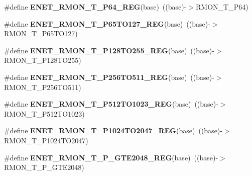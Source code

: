 \begin{DoxyCompactItemize}
\item 
\#define {\bfseries E\+N\+E\+T\+\_\+\+R\+M\+O\+N\+\_\+\+T\+\_\+\+P64\+\_\+\+R\+EG}(base)~((base)-\/$>$R\+M\+O\+N\+\_\+\+T\+\_\+\+P64)\hypertarget{group__ENET__Register__Accessor__Macros_gac6e972af8744e5005a436b92e016fcfd}{}\label{group__ENET__Register__Accessor__Macros_gac6e972af8744e5005a436b92e016fcfd}

\item 
\#define {\bfseries E\+N\+E\+T\+\_\+\+R\+M\+O\+N\+\_\+\+T\+\_\+\+P65\+T\+O127\+\_\+\+R\+EG}(base)~((base)-\/$>$R\+M\+O\+N\+\_\+\+T\+\_\+\+P65\+T\+O127)\hypertarget{group__ENET__Register__Accessor__Macros_ga64e4272ae765715d1815cb3f9222a846}{}\label{group__ENET__Register__Accessor__Macros_ga64e4272ae765715d1815cb3f9222a846}

\item 
\#define {\bfseries E\+N\+E\+T\+\_\+\+R\+M\+O\+N\+\_\+\+T\+\_\+\+P128\+T\+O255\+\_\+\+R\+EG}(base)~((base)-\/$>$R\+M\+O\+N\+\_\+\+T\+\_\+\+P128\+T\+O255)\hypertarget{group__ENET__Register__Accessor__Macros_gaaf4a671ca3150cb5b31f9100ad1f4652}{}\label{group__ENET__Register__Accessor__Macros_gaaf4a671ca3150cb5b31f9100ad1f4652}

\item 
\#define {\bfseries E\+N\+E\+T\+\_\+\+R\+M\+O\+N\+\_\+\+T\+\_\+\+P256\+T\+O511\+\_\+\+R\+EG}(base)~((base)-\/$>$R\+M\+O\+N\+\_\+\+T\+\_\+\+P256\+T\+O511)\hypertarget{group__ENET__Register__Accessor__Macros_ga262439a7f1d338d06bab85d00c8500d9}{}\label{group__ENET__Register__Accessor__Macros_ga262439a7f1d338d06bab85d00c8500d9}

\item 
\#define {\bfseries E\+N\+E\+T\+\_\+\+R\+M\+O\+N\+\_\+\+T\+\_\+\+P512\+T\+O1023\+\_\+\+R\+EG}(base)~((base)-\/$>$R\+M\+O\+N\+\_\+\+T\+\_\+\+P512\+T\+O1023)\hypertarget{group__ENET__Register__Accessor__Macros_gaea527dbb4c59c6f6f516c63efff1392e}{}\label{group__ENET__Register__Accessor__Macros_gaea527dbb4c59c6f6f516c63efff1392e}

\item 
\#define {\bfseries E\+N\+E\+T\+\_\+\+R\+M\+O\+N\+\_\+\+T\+\_\+\+P1024\+T\+O2047\+\_\+\+R\+EG}(base)~((base)-\/$>$R\+M\+O\+N\+\_\+\+T\+\_\+\+P1024\+T\+O2047)\hypertarget{group__ENET__Register__Accessor__Macros_gad9a42bdbd68d55b77bce407c60ba2ea1}{}\label{group__ENET__Register__Accessor__Macros_gad9a42bdbd68d55b77bce407c60ba2ea1}

\item 
\#define {\bfseries E\+N\+E\+T\+\_\+\+R\+M\+O\+N\+\_\+\+T\+\_\+\+P\+\_\+\+G\+T\+E2048\+\_\+\+R\+EG}(base)~((base)-\/$>$R\+M\+O\+N\+\_\+\+T\+\_\+\+P\+\_\+\+G\+T\+E2048)\hypertarget{group__ENET__Register__Accessor__Macros_ga10558658ffdc68e34d98a8e5a654bbd1}{}\label{group__ENET__Register__Accessor__Macros_ga10558658ffdc68e34d98a8e5a654bbd1}


\end{DoxyCompactItemize}
